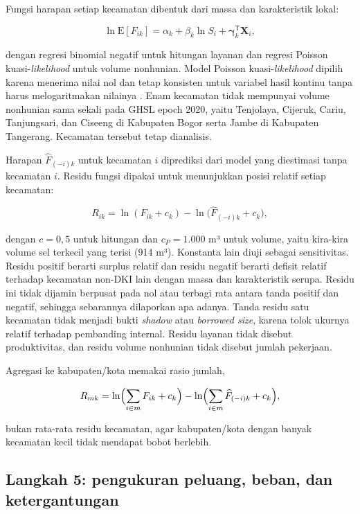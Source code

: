 \documentclass[12pt,a4paper,oneside,openany,indonesian]{report}
\begin{document}
Fungsi harapan setiap kecamatan dibentuk dari massa dan karakteristik
lokal:

\[
\ln \mathrm{E}[F_{ik}] = \alpha_k + \beta_k \ln S_i + \boldsymbol{\gamma}_k^{\mathsf T}\mathbf{X}_i ,
\]

\noindent dengan regresi binomial negatif untuk hitungan layanan dan
regresi Poisson kuasi-\emph{likelihood} untuk volume nonhunian. Model
Poisson kuasi-\emph{likelihood} dipilih karena menerima nilai nol dan
tetap konsisten untuk variabel hasil kontinu tanpa harus
melogaritmakan nilainya \parencite{santossilvatenreyro2006}. Enam kecamatan tidak
mempunyai volume nonhunian sama sekali pada GHSL epoch 2020, yaitu
Tenjolaya, Cijeruk, Cariu, Tanjungsari, dan Ciseeng di Kabupaten Bogor
serta Jambe di Kabupaten Tangerang. Kecamatan tersebut tetap dianalisis.

Harapan $\widehat F_{(-i)k}$ untuk kecamatan $i$ diprediksi dari model
yang diestimasi tanpa kecamatan $i$. Residu fungsi dipakai untuk
menunjukkan posisi relatif setiap kecamatan:

\[
R_{ik} = \ln(F_{ik} + c_k) - \ln\bigl(\widehat F_{(-i)k} + c_k\bigr),
\]

\noindent dengan $c = 0{,}5$ untuk hitungan dan $c_P = 1.000$ m³ untuk
volume, yaitu kira-kira volume sel terkecil yang terisi (914 m³).
Konstanta lain diuji sebagai sensitivitas. Residu positif berarti
surplus relatif dan residu negatif berarti defisit relatif terhadap
kecamatan non-DKI lain dengan massa dan karakteristik serupa. Residu ini
tidak dijamin berpusat pada nol atau terbagi rata antara tanda positif
dan negatif, sehingga sebarannya dilaporkan apa adanya. Tanda residu
satu kecamatan tidak menjadi bukti \emph{shadow} atau \emph{borrowed
size}, karena tolok ukurnya relatif terhadap pembanding internal.
Residu layanan tidak disebut produktivitas, dan residu volume nonhunian
tidak disebut jumlah pekerjaan.

Agregasi ke kabupaten/kota memakai rasio jumlah,

\[
R_{mk} = \ln\Bigl(\sum_{i \in m} F_{ik} + c_k\Bigr) - \ln\Bigl(\sum_{i \in m} \widehat F_{(-i)k} + c_k\Bigr),
\]

\noindent bukan rata-rata residu kecamatan, agar kabupaten/kota dengan
banyak kecamatan kecil tidak mendapat bobot berlebih.

\subsection{Langkah 5: pengukuran peluang, beban, dan ketergantungan}\label{langkah-5-pemisahan-manfaat-ketergantungan-dan-beban}
\end{document}
